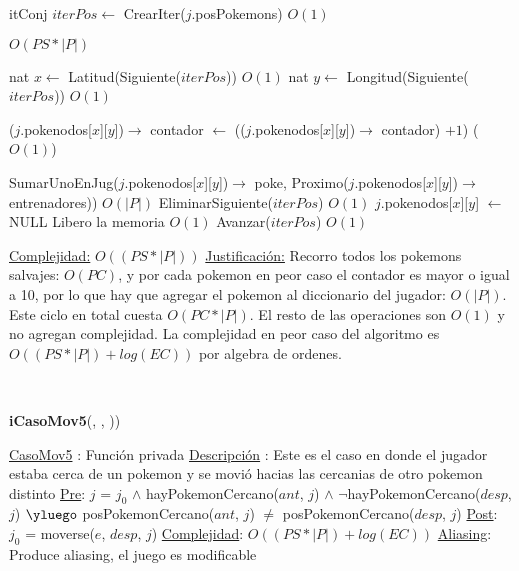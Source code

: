 \begin{Algoritmos}
\begin{algorithmic}[1]
$ $\newline


\State itConj $iterPos \gets$ CrearIter($j$.posPokemons) \Comment $O(1)$ 

 \Comment $O(PS * |P|)$

  \State nat $x \gets$ Latitud(Siguiente($iterPos$)) \Comment $O(1)$
  \State nat $y \gets$ Longitud(Siguiente($iterPos$)) \Comment $O(1)$   
  
  \State ($j$.pokenodos[$x$][$y$])$\rightarrow$ contador $\gets$ (($j$.pokenodos[$x$][$y$])$\rightarrow$ contador) $+ 1$) \Comment($O(1)$)
  
    \State SumarUnoEnJug($j$.pokenodos[$x$][$y$])$\rightarrow$ poke, Proximo($j$.pokenodos[$x$][$y$])$\rightarrow$ entrenadores)) \Comment $O(|P|)$
    \State EliminarSiguiente($iterPos$) \Comment $O(1)$
    \State $j$.pokenodos[$x$][$y$] $\gets$ NULL \Comment Libero la memoria $O(1)$
  \Else 
    \State Avanzar($iterPos$) \Comment $O(1)$ 
  \EndIf

\EndWhile 



\medskip
\Statex \underline{Complejidad:} $O((PS *|P|))$ 
\Statex \underline{Justificaci\'on:} Recorro todos los pokemons salvajes: $O(PC)$, y por cada pokemon en peor caso el contador es mayor o igual a 10, por lo que hay que agregar el pokemon al diccionario del jugador: $O(|P|)$. Este ciclo en total cuesta $O(PC*|P|)$. El resto de las operaciones son $O(1)$ y no agregan complejidad. La complejidad en peor caso del algoritmo es $O((PS *|P|) + log(EC))$ por algebra de ordenes.
\end{algorithmic}

$ $\newline
$ $\newline


{\textbf{iCasoMov5}(,  , ))}
\begin{algorithmic}[1]

\Statex \underline{CasoMov5} : Funci\'on privada 
\Statex \underline{Descripci\'on} : Este es el caso en donde el jugador estaba cerca de un pokemon y se movi\'o hacias las cercanias de otro pokemon distinto
\Statex \underline{Pre}: $j$ = $j_0$ $\land$ hayPokemonCercano($ant$, $j$) $\land$ $\neg$hayPokemonCercano($desp$, $j$) $\yluego$ posPokemonCercano($ant$, $j$) $\neq$ posPokemonCercano($desp$, $j$)
\Statex \underline{Post}: $j_0$ = moverse($e$, $desp$, $j$) 
\Statex \underline{Complejidad}:  $O((PS *|P|) + log(EC))$ 
\Statex \underline{Aliasing}: Produce aliasing, el juego es modificable


\end{algorithmic}
\end{Algoritmos}
